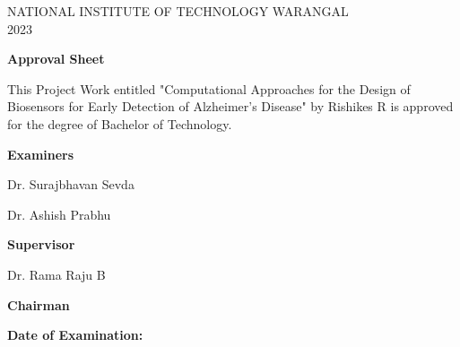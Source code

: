 \begin{center}
    \Large{NATIONAL INSTITUTE OF TECHNOLOGY WARANGAL}\\
    2023\\

    \vspace{1cm}

    \textbf{Approval Sheet}\\

    \vspace{1cm}

    \normalsize{This Project Work entitled "Computational Approaches for the Design of Biosensors for Early Detection of Alzheimer's Disease" by Rishikes R is approved for the degree of Bachelor of Technology.}

    \vspace{1cm}

    \textbf{Examiners}

    \vspace{.5cm}

    Dr. Surajbhavan Sevda\\

    \vspace{.5cm}

    Dr. Ashish Prabhu\\

    \vspace{.5cm}

    \underline{\hspace{2in}}

    \vspace{1cm}

    \textbf{Supervisor}

    \vspace{.5cm}

    Dr. Rama Raju B\\

    \vspace{1cm}

    \textbf{Chairman}

    \vspace{.5cm}

    \underline{\hspace{2in}}

    \raggedright
    
    \vspace{2.5cm}

    \textbf{Date of Examination: }

\end{center}

\newpage
